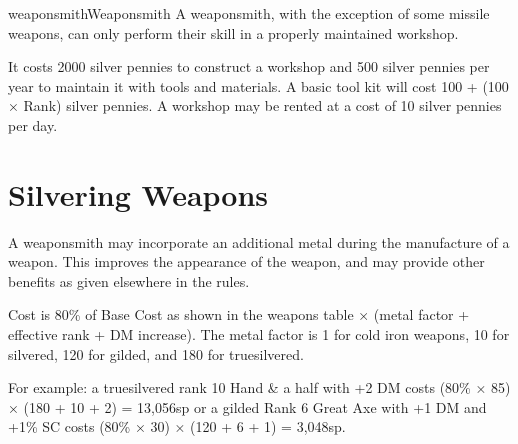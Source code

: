 \begin{Skill}[1.1]{weaponsmith}{Weaponsmith}
A weaponsmith, with the exception of some missile weapons, can only
perform their skill in a properly maintained workshop.

It costs 2000 silver pennies to construct a workshop and 500 silver
pennies per year to maintain it with tools and materials. A basic tool
kit will cost 100 + (100 × Rank) silver pennies.  A workshop may be
rented at a cost of 10 silver pennies per day.

\section{Silvering Weapons}

A weaponsmith may incorporate an additional metal during the
manufacture of a weapon.  This improves the appearance of the weapon,
and may provide other benefits as given elsewhere in the rules.

Cost is 80\% of Base Cost as shown in the weapons table × (metal
factor + effective rank + DM increase).  The metal factor is 1 for
cold iron weapons, 10 for silvered, 120 for gilded, and 180 for
truesilvered.

For example: a truesilvered rank 10 Hand \& a half with +2 DM costs
(80\% × 85) × (180 + 10 + 2) = 13,056sp or a gilded Rank 6 Great Axe
with +1 DM and +1\% SC costs (80\% × 30) × (120 + 6 + 1) = 3,048sp.

\end{Skill}
